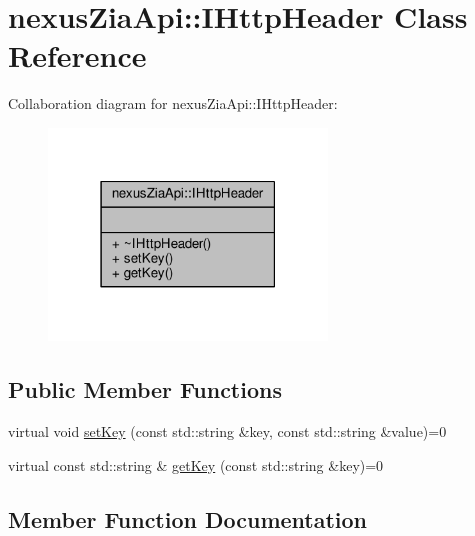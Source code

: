 \hypertarget{classnexusZiaApi_1_1IHttpHeader}{}\section{nexus\+Zia\+Api\+:\+:I\+Http\+Header Class Reference}
\label{classnexusZiaApi_1_1IHttpHeader}


Collaboration diagram for nexus\+Zia\+Api\+:\+:I\+Http\+Header\+:\nopagebreak
\begin{figure}[H]
\begin{center}
\leavevmode
\includegraphics[width=210pt]{classnexusZiaApi_1_1IHttpHeader__coll__graph}
\end{center}
\end{figure}
\subsection*{Public Member Functions}
\begin{DoxyCompactItemize}
\item 
virtual void \hyperlink{classnexusZiaApi_1_1IHttpHeader_ad7bbf7ae0822953c462b2098c24a0eaf}{set\+Key} (const std\+::string \&key, const std\+::string \&value)=0
\item 
virtual const std\+::string \& \hyperlink{classnexusZiaApi_1_1IHttpHeader_a165d7493d3f6a8f2cbb498776c835e87}{get\+Key} (const std\+::string \&key)=0
\end{DoxyCompactItemize}


\subsection{Member Function Documentation}
